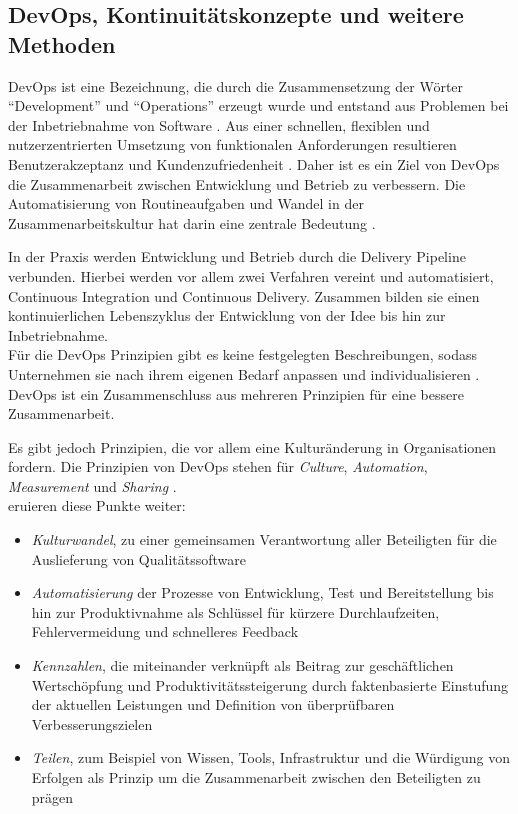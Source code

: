 \subsection{DevOps, Kontinuitätskonzepte und weitere Methoden}
DevOps ist eine Bezeichnung, die durch die Zusammensetzung der Wörter \enquote{Development} und \enquote{Operations} erzeugt wurde und entstand aus Problemen bei der Inbetriebnahme von Software \cite{mci/Disterer2011}. Aus einer schnellen, flexiblen und nutzerzentrierten Umsetzung von funktionalen Anforderungen resultieren Benutzerakzeptanz und Kundenzufriedenheit \cite{mci/Disterer2011, Alt2017}. Daher ist es ein Ziel von DevOps die Zusammenarbeit zwischen Entwicklung und Betrieb zu verbessern. Die Automatisierung von Routineaufgaben und Wandel in der Zusammenarbeitskultur hat darin eine zentrale Bedeutung \cite{Alt2017}. 

In der Praxis werden Entwicklung und Betrieb durch die Delivery Pipeline verbunden.
Hierbei werden vor allem zwei Verfahren vereint und automatisiert, Continuous Integration und Continuous Delivery. Zusammen bilden sie einen kontinuierlichen Lebenszyklus der Entwicklung von der Idee bis hin zur Inbetriebnahme.
\medskip
\\
Für die DevOps Prinzipien gibt es keine festgelegten Beschreibungen, sodass Unternehmen sie nach ihrem eigenen Bedarf anpassen und individualisieren \cite{Alt2017}. DevOps ist ein Zusammenschluss aus mehreren Prinzipien für eine bessere Zusammenarbeit.

Es gibt jedoch Prinzipien, die vor allem eine Kulturänderung in Organisationen fordern. Die Prinzipien von DevOps stehen für \emph{Culture}, \emph{Automation}, \emph{Measurement} und \emph{Sharing} \cite{humble:2011}. 
\medskip
\\
\citet[S.26f]{Alt2017} eruieren diese Punkte weiter:
\begin{itemize}
    \item \emph{Kulturwandel}, zu einer gemeinsamen Verantwortung aller Beteiligten für die Auslieferung von Qualitätssoftware
    \item \emph{Automatisierung} der Prozesse von Entwicklung, Test und Bereitstellung bis hin zur Produktivnahme als Schlüssel für kürzere Durchlaufzeiten, Fehlervermeidung und schnelleres Feedback
    \item \emph{Kennzahlen}, die miteinander verknüpft als Beitrag zur geschäftlichen Wertschöpfung und Produktivitätssteigerung durch faktenbasierte Einstufung der aktuellen Leistungen und Definition von überprüfbaren Verbesserungszielen
    \item \emph{Teilen}, zum Beispiel von Wissen, Tools, Infrastruktur und die Würdigung von Erfolgen als Prinzip um die Zusammenarbeit zwischen den Beteiligten zu prägen
\end{itemize}

